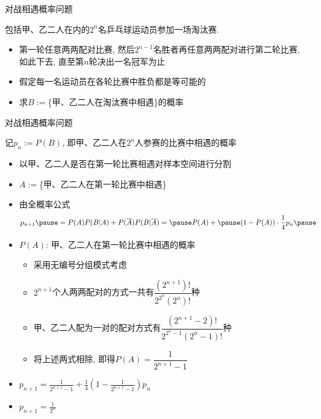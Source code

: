 \documentclass[Prob-All.tex]{subfiles}
\begin{document}
\begin{frame}{对战相遇概率问题}
	\begin{exam}
		包括甲、乙二人在内的$2^n$名乒乓球运动员参加一场淘汰赛.
		\begin{itemize}[<+-|alert@+>]
			\item 第一轮任意两两配对比赛, 然后$2^{n-1}$名胜者再任意两两配对进行第二轮比赛, 如此下去, 直至第$n$轮决出一名冠军为止
			\item 假定每一名运动员在各轮比赛中胜负都是等可能的
			\item 求$B:=$\{甲、乙二人在淘汰赛中相遇\}的概率
		\end{itemize}
	\end{exam}


\end{frame}
\begin{frame}{对战相遇概率问题}
		\begin{jieda}
		记$p_n:=P(B)$, 即甲、乙二人在$2^n$人参赛的比赛中相遇的概率%
		\begin{itemize}[<+-|alert@+>]
			\item 以甲、乙二人是否在第一轮比赛相遇对样本空间进行分割
			\item $A:=$\{甲、乙二人在第一轮比赛中相遇\}
			\item 由全概率公式
			\begin{align*}
				p_{n+1}\pause &=P(A)P(B|A)+P(\overline{A})P(B|\overline{A})=\pause P(A)+\pause (1-P(A))\cdot \dfrac{1}{4}p_n\pause
			\end{align*}
			\item $P(A)$: 甲、乙二人在第一轮比赛中相遇的概率
			\begin{itemize}[<+-|alert@+>]
				\item 采用无编号分组模式考虑
				\item $2^{n+1}$个人两两配对的方式一共有$\dfrac{(2^{n+1})!}{2^{2^n}(2^n)!}$种
				\item 甲、乙二人配为一对的配对方式有$\dfrac{(2^{n+1}-2)!}{2^{2^n-1}(2^n-1)!}$种
				\item 将上述两式相除, 即得$P(A)=\dfrac{1}{2^{n+1}-1}$%
			\end{itemize}
		\item 	$p_{n+1}=\frac{1}{2^{n+1}-1}+\frac{1}{4}(1-\frac{1}{2^{n+1}-1})p_n$
		\item $p_{n+1}=\frac{1}{2^n}$
		\end{itemize}
%
%
	\end{jieda}
\end{frame}
\end{document}
